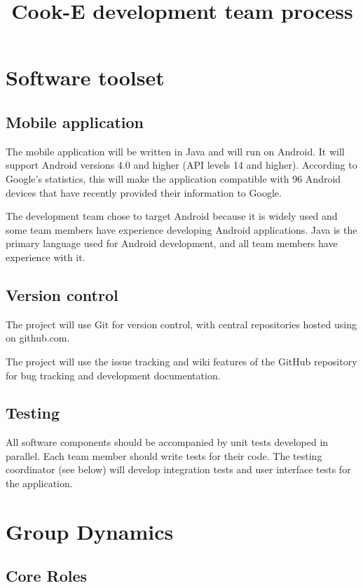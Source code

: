 \documentclass[10pt]{article}
\title{Cook-E development team process}
\begin{document}
\maketitle{}


\section{Software toolset}

\subsection{Mobile application}

The mobile application will be written in Java and will run on Android. It will support Android versions 4.0 and higher
(API levels 14 and higher). According to Google's statistics, this will make the application compatible with 96%
Android devices that have recently provided their information to Google.

The development team chose to target Android because it is widely used and some team members have experience developing
Android applications. Java is the primary language used for Android development, and all team members have experience with
it.

\subsection{Version control}

The project will use Git for version control, with central repositories hosted using on github.com.

The project will use the issue tracking and wiki features of the GitHub repository for bug tracking and development documentation.
\subsection{Testing}

All software components should be accompanied by unit tests developed in parallel.
Each team member should write tests for their code.
The testing coordinator (see below) will develop integration tests and user interface tests for the application.

\section{Group Dynamics}

\subsection{Core Roles}
\end{document}
